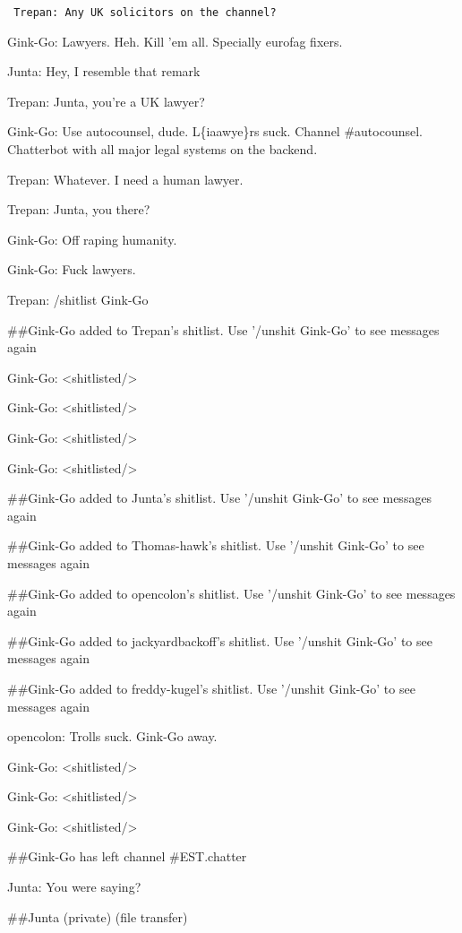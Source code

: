 {\raggedright
\tt
\addtolength{\parskip}{0.5\baselineskip}
Trepan: Any UK solicitors on the channel?

Gink-Go: Lawyers. Heh. Kill 'em all. Specially eurofag fixers.

Junta: Hey, I resemble that remark

Trepan: Junta, you're a UK lawyer?

Gink-Go: Use autocounsel, dude. L\{ia\textbar{}awye\}rs suck.
Channel \#autocounsel. Chatterbot with all major legal systems on
the backend.

Trepan: Whatever. I need a human lawyer.

Trepan: Junta, you there?

Gink-Go: Off raping humanity.

Gink-Go: Fuck lawyers.

Trepan: /shitlist Gink-Go

\#\#Gink-Go added to Trepan's shitlist. Use '/unshit Gink-Go' to
see messages again

Gink-Go: \textless{}shitlisted/\textgreater{}

Gink-Go: \textless{}shitlisted/\textgreater{}

Gink-Go: \textless{}shitlisted/\textgreater{}

Gink-Go: \textless{}shitlisted/\textgreater{}

\#\#Gink-Go added to Junta's shitlist. Use '/unshit Gink-Go' to see
messages again

\#\#Gink-Go added to Thomas-hawk's shitlist. Use '/unshit Gink-Go'
to see messages again

\#\#Gink-Go added to opencolon's shitlist. Use '/unshit Gink-Go' to
see messages again

\#\#Gink-Go added to jackyardbackoff's shitlist. Use '/unshit
Gink-Go' to see messages again

\#\#Gink-Go added to freddy-kugel's shitlist. Use '/unshit Gink-Go'
to see messages again

opencolon: Trolls suck. Gink-Go away.

Gink-Go: \textless{}shitlisted/\textgreater{}

Gink-Go: \textless{}shitlisted/\textgreater{}

Gink-Go: \textless{}shitlisted/\textgreater{}

\#\#Gink-Go has left channel \#EST.chatter

Junta: You were saying?

\#\#Junta (private) (file transfer)

}
